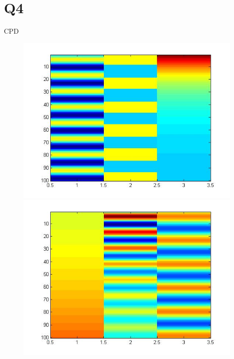 \documentclass[t,12pt,english
\ifx\beamermode\undefined\else,\beamermode\fi
]{beamer}
\begin{document}
\section{Q4}

\begin{frame}{CPD}
\begin{figure}[!htbp]
%
\centering
\includegraphics[width=1\textwidth]{11.jpg}
\endminipage\hfill
{}%
\centering
\includegraphics[width=1\textwidth]{12.jpg}
\endminipage\hfill
{}%
\centering

\end{figure}
\end{frame}
\end{document}
